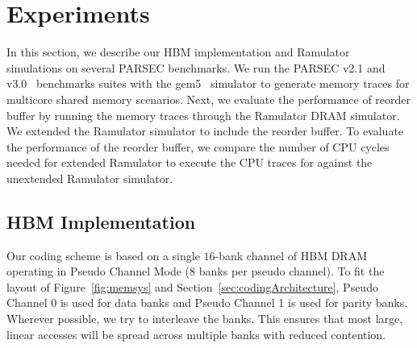   \section{Experiments}
\label{sec:experiments}

In this section, we describe our HBM implementation and Ramulator ~\cite{Ramulator} simulations on several PARSEC benchmarks. We run the PARSEC v2.1 and v3.0~\cite{bienia09parsec2} benchmarks suites with the gem5~\cite{parsec_2_1_m5} simulator to generate memory traces for multicore shared memory scenarios. Next, we evaluate the performance of reorder buffer by running the memory traces through the Ramulator DRAM simulator. We extended the Ramulator simulator to include the reorder buffer. To evaluate the performance of the reorder buffer, we compare the number of CPU cycles needed for extended Ramulator to execute the CPU traces for against the unextended Ramulator simulator.

\subsection{HBM Implementation}
Our coding scheme is based on a single $16$-bank channel of HBM DRAM operating in Pseudo Channel Mode ($8$ banks per pseudo channel). To fit the layout of Figure~\ref{fig:memsys} and Section~\ref{sec:codingArchitecture}, Pseudo Channel 0 is used for data banks and Pseudo Channel 1 is used for parity banks. 
%
%
Wherever possible, we try to interleave the banks. This ensures that most large, linear accesses will be spread across multiple banks with reduced contention.

